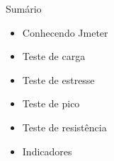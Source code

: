 
\begin{frame}{Sumário}
    \begin{itemize}
        \item Conhecendo Jmeter
        \item Teste de carga
        \item Teste de estresse
        \item Teste de pico
        \item Teste de resistência
        \item Indicadores
    \end{itemize}
\end{frame}